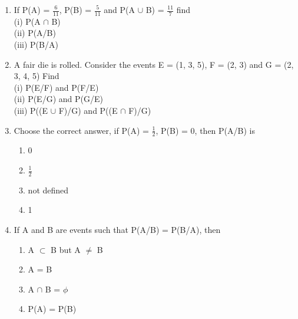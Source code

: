 \begin{enumerate}[label=\thesection.\arabic*.,ref=\thesection.\theenumi]
\item If P(A) = $\frac{6}{11}$, P(B) = $\frac{5}{11}$ and P(A $\cup$ B) = $\frac{11}{7}$ find\\
(i) P(A $\cap$ B)\\ 
(ii) P(A/B)\\ 
(iii) P(B/A)
\\
\item A fair die is rolled. Consider the events E =  (1, 3, 5), F = (2, 3) and G = (2, 3, 4, 5) Find\\
(i) P(E/F) and P(F/E) \\
(ii) P(E/G) and P(G/E)\\
(iii) P((E $\cup$ F)/G) and P((E $\cap$ F)/G)\\
\solution

\item Choose the correct answer, if P(A) = $\frac{1}{2}$, P(B) = 0, then P(A/B) is
\begin{enumerate}
\item 0
\item $\frac{1}{2}$
\item not defined
\item 1
\end{enumerate}
\solution


\item If A and B are events such that P(A/B) = P(B/A), then
\begin{enumerate}
\item A $\subset$ B but A $\neq$ B
\item A = B
\item A $\cap$ B = $\phi$
\item P(A) = P(B)
\end{enumerate}
\solution



\end{enumerate}
